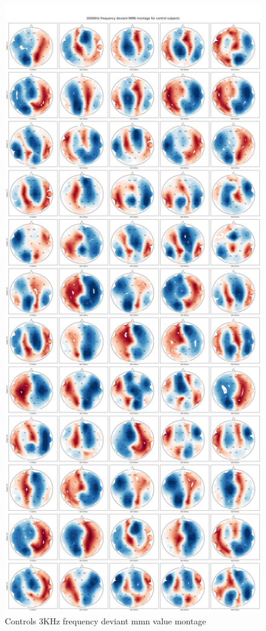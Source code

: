 \documentclass[10pt]{article}
\begin{document}
\begin{figure}[H]
  \includegraphics[width=16cm]{../../../data_analysis_results/MMN/montage/Control/3KHz_frequency_deviant_montage.png}
  \caption{Controls 3KHz frequency deviant \gls{mmn} value montage}\label{control_3KHz_mmn_montage}
\end{figure}
\end{document}
